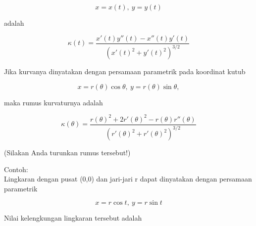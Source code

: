 \documentclass[12pt,arial,letterpaper]{book}
\begin{document}
\begin{eulernootebook}
\begin{eulercomment}
\begin{eulercomment}
\begin{eulernootebook}
\begin{eulercomment}
\begin{eulercomment}
\begin{eulercomment}
\begin{eulercomment}
\begin{eulercomment}
\begin{eulercomment}
\begin{eulernotebook}
\begin{eulercomment}
\begin{eulercomment}
\begin{eulercomment}
\begin{eulercomment}
\begin{eulercomment}
\begin{eulercomment}
\begin{eulercomment}
\begin{eulercomment}
\begin{eulercomment}
\begin{eulercomment}
\begin{eulercomment}
\begin{eulercomment}
\begin{eulercomment}
\begin{eulercomment}
\begin{eulercomment}
\begin{eulercomment}
\begin{eulercomment}
\begin{eulercomment}
\begin{eulercomment}
\begin{eulercomment}
\begin{eulercomment}
\end{eulercomment}
\begin{eulerformula}
\[
x=x(t),\ y=y(t)
\]
\end{eulerformula}
\begin{eulercomment}
adalah

\end{eulercomment}
\begin{eulerformula}
\[
\kappa(t) = \frac{x'(t)y''(t)-x''(t)y'(t)}{\left(x'(t)^2+y'(t)^2\right)^{3/2}}
\]
\end{eulerformula}
\begin{eulercomment}
Jika kurvanya dinyatakan dengan persamaan parametrik pada koordinat
kutub

\end{eulercomment}
\begin{eulerformula}
\[
x=r(\theta)\cos\theta,\ y=r(\theta)\sin\theta,
\]
\end{eulerformula}
\begin{eulercomment}
maka rumus kurvaturnya adalah

\end{eulercomment}
\begin{eulerformula}
\[
\kappa(\theta) = \frac{r(\theta)^2+2r'(\theta)^2-r(\theta)r''(\theta)}{\left(r'(\theta)^2+r'(\theta)^2\right)^{3/2}}
\]
\end{eulerformula}
\begin{eulercomment}
(Silakan Anda turunkan rumus tersebut!)

Contoh:\\
Lingkaran dengan pusat (0,0) dan jari-jari r dapat dinyatakan dengan
persamaan parametrik

\end{eulercomment}
\begin{eulerformula}
\[
x=r\cos t,\ y=r\sin t
\]
\end{eulerformula}
\begin{eulercomment}
Nilai kelengkungan lingkaran tersebut adalah


\end{eulercomment}
\end{eulercomment}
\end{eulercomment}
\end{eulercomment}
\end{eulercomment}
\end{eulercomment}
\end{eulercomment}
\end{eulercomment}
\end{eulercomment}
\end{eulercomment}
\end{eulercomment}
\end{eulercomment}
\end{eulercomment}
\end{eulercomment}
\end{eulercomment}
\end{eulercomment}
\end{eulercomment}
\end{eulercomment}
\end{eulercomment}
\end{eulercomment}
\end{eulercomment}
\end{eulernotebook}
\end{eulercomment}
\end{eulercomment}
\end{eulercomment}
\end{eulercomment}
\end{eulercomment}
\end{eulercomment}
\end{eulernootebook}
\end{eulercomment}
\end{eulercomment}
\end{eulernootebook}
\end{document}
